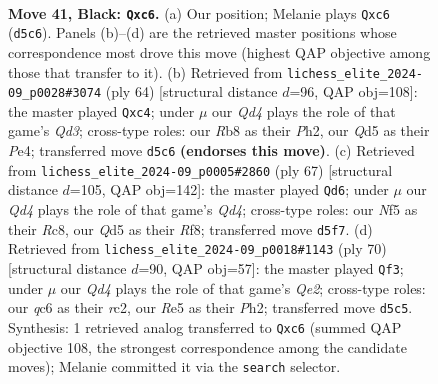 \documentclass[11pt]{article}
\begin{document}
\clearpage

\begin{figure}[p]\centering
\begin{subfigure}{0.46\textwidth}\centering
\resizebox{\linewidth}{!}{%
\newchessgame
\chessboard[
  setfen={1r6/2R5/p1Qp1kp1/3qrn1p/1p5P/4p3/4NPP1/R4K2 b - - 1 41},
  showmover=false,
  pgfstyle=straightmove, color=movearrow, markmove={d5-c6}
]}
\caption{}
\end{subfigure}\hfill
\begin{subfigure}{0.46\textwidth}\centering
\resizebox{\linewidth}{!}{%
\newchessgame
\chessboard[
  setfen={8/p4k1p/1n1pNrp1/3P4/2q1PP2/3Q4/P5KP/5R2 w - - 3 33},
  showmover=false,
  pgfstyle=straightmove, color=movearrow, markmove={d3-c4}
]}
\caption{}
\end{subfigure}
\\[4pt]
\begin{subfigure}{0.46\textwidth}\centering
\resizebox{\linewidth}{!}{%
\newchessgame
\chessboard[
  setfen={2r2r2/1p2kpQ1/4p1p1/p2qR1N1/P2n2PP/8/5P2/4R1K1 b - - 2 34},
  showmover=false,
  pgfstyle=straightmove, color=movearrow, markmove={d5-d6}
]}
\caption{}
\end{subfigure}\hfill
\begin{subfigure}{0.46\textwidth}\centering
\resizebox{\linewidth}{!}{%
\newchessgame
\chessboard[
  setfen={1kr5/8/p2pN3/1p3P2/3P2Pq/P5Rp/KPr1Q2P/8 w - - 7 36},
  showmover=false,
  pgfstyle=straightmove, color=movearrow, markmove={e2-f3}
]}
\caption{}
\end{subfigure}
\caption{\textbf{Move 41, Black: \texttt{Qxc6}.} (a) Our position; Melanie plays \texttt{Qxc6} (\texttt{d5c6}). Panels (b)--(d) are the retrieved master positions whose correspondence most drove this move (highest QAP objective among those that transfer to it). (b) Retrieved from \texttt{lichess\_elite\_2024-09\_p0028\#3074} (ply 64) [structural distance $d$=96, QAP obj=108]: the master played \texttt{Qxc4}; under $\mu$ our \emph{Qd4} plays the role of that game's \emph{Qd3}; cross-type roles: our \emph{R}b8 as their \emph{P}h2, our \emph{Q}d5 as their \emph{P}e4; transferred move \texttt{d5c6} \textbf{(endorses this move)}. (c) Retrieved from \texttt{lichess\_elite\_2024-09\_p0005\#2860} (ply 67) [structural distance $d$=105, QAP obj=142]: the master played \texttt{Qd6}; under $\mu$ our \emph{Qd4} plays the role of that game's \emph{Qd4}; cross-type roles: our \emph{N}f5 as their \emph{R}c8, our \emph{Q}d5 as their \emph{R}f8; transferred move \texttt{d5f7}. (d) Retrieved from \texttt{lichess\_elite\_2024-09\_p0018\#1143} (ply 70) [structural distance $d$=90, QAP obj=57]: the master played \texttt{Qf3}; under $\mu$ our \emph{Qd4} plays the role of that game's \emph{Qe2}; cross-type roles: our \emph{q}c6 as their \emph{r}c2, our \emph{R}e5 as their \emph{P}h2; transferred move \texttt{d5c5}. Synthesis: 1 retrieved analog transferred to \texttt{Qxc6} (summed QAP objective 108, the strongest correspondence among the candidate moves); Melanie committed it via the \texttt{search} selector.}
\label{fig:thought-m81}
\end{figure}
\end{document}
